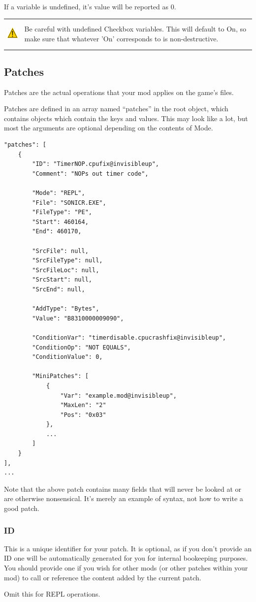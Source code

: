 \documentclass[12pt,a4paper,notitlepage]{article}
\newcommand{\warning}[1]{
	\begin{tabular}{ m{1.1cm}  m{11cm} }
	&\\
	\includegraphics[width=1.1cm, height=1.1cm]{warning} & #1
	\\&\\
	\end{tabular}
}
\begin{document}
If a variable is undefined, it's value will be reported as 0.

\warning{Be careful with undefined Checkbox variables. This will default to On, so make sure that whatever 'On' corresponds to is non-destructive.}

\subsection{Patches}
\label{subsec:create-patch}
Patches are the actual operations that your mod applies on the game's files.

Patches are defined in an array named ``patches'' in the root object, which contains objects which contain the keys and values. This may look like a lot, but most the arguments are optional depending on the contents of Mode.

\begin{lstlisting}[breaklines=true]
"patches": [
	{	
		"ID": "TimerNOP.cpufix@invisibleup",
		"Comment": "NOPs out timer code",
		
		"Mode": "REPL",
		"File": "SONICR.EXE",
		"FileType": "PE",
		"Start": 460164,
		"End": 460170,
		
		"SrcFile": null,
		"SrcFileType": null,
		"SrcFileLoc": null,
		"SrcStart": null,
		"SrcEnd": null,
		
		"AddType": "Bytes",
		"Value": "B8310000009090",
		
		"ConditionVar": "timerdisable.cpucrashfix@invisibleup",
		"ConditionOp": "NOT EQUALS",
		"ConditionValue": 0,
		
		"MiniPatches": [
			{
				"Var": "example.mod@invisibleup",
				"MaxLen": "2"
				"Pos": "0x03"
			},
			...
		]
	}
],
...
\end{lstlisting}
Note that the above patch contains many fields that will never be looked at or are otherwise nonsensical. It's merely an example of syntax, not how to write a good patch.

\subsubsection{ID}
This is a unique identifier for your patch. It is optional, as if you don't provide an ID one will be automatically generated for you for internal bookeeping purposes. You should provide one if you wish for other mods (or other patches within your mod) to call or reference the content added by the current patch.

Omit this for REPL operations.
\end{document}
